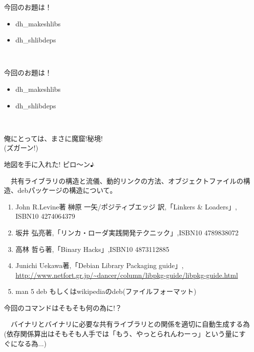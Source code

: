 \begin{frame}{今回のお題は！}

\begin{itemize}
\item dh\_makeshlibs
\item dh\_shlibdeps
\end{itemize}　

\end{frame}

\begin{frame}{今回のお題は！}

\begin{itemize}
\item dh\_makeshlibs
\item dh\_shlibdeps
\end{itemize}　

\begin{center}
\Large
俺にとっては、まさに魔窟!秘境!\\
(ズガーン!)
\end{center}

\end{frame}

\begin{frame}{地図を手に入れた! ピロ〜ン♪}

　共有ライブラリの構造と流儀、動的リンクの方法、オブジェクトファイルの構造、debパッケージの構造について。

\begin{enumerate}
\item John R.Levine著 榊原 一矢/ポジティブエッジ 訳,「Linkers \& Loaders」,
ISBN10 4274064379
\item 坂井 弘亮著,「リンカ・ローダ実践開発テクニック」,ISBN10 4789838072
\item 高林 哲ら著,「Binary Hacks」,ISBN10 4873112885
\item Junichi Uekawa著,「Debian Library Packaging guide」,\\
\url{http://www.netfort.gr.jp/~dancer/column/libpkg-guide/libpkg-guide.html}
\item man 5 deb もしくはwikipediaのdeb(ファイルフォーマット)
\end{enumerate}

\end{frame}

\begin{frame}{今回のコマンドはそもそも何の為に!？}

{
 \Large
　バイナリとバイナリに必要な共有ライブラリとの関係を適切に自動生成する為\\
(依存関係算出はそもそも人手では「もう、やっとられんわーっ」という量にすぐになる為...)
 }

\end{frame}


